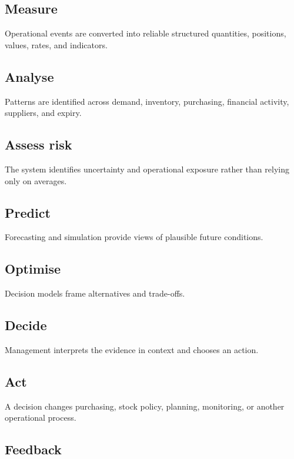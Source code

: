 \documentclass[11pt,a4paper]{article}
\begin{document}
\subsection{Measure}

Operational events are converted into reliable structured quantities,
positions, values, rates, and indicators.

\subsection{Analyse}

Patterns are identified across demand, inventory, purchasing, financial
activity, suppliers, and expiry.

\subsection{Assess risk}

The system identifies uncertainty and operational exposure rather than relying
only on averages.

\subsection{Predict}

Forecasting and simulation provide views of plausible future conditions.

\subsection{Optimise}

Decision models frame alternatives and trade-offs.

\subsection{Decide}

Management interprets the evidence in context and chooses an action.

\subsection{Act}

A decision changes purchasing, stock policy, planning, monitoring, or another
operational process.

\subsection{Feedback}
\end{document}
